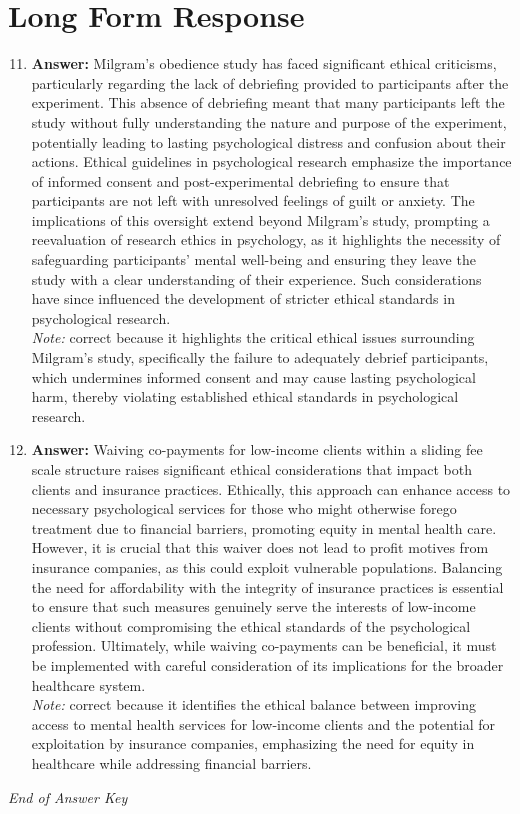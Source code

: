 \documentclass[12pt]{article}
\begin{document}
\section*{Long Form Response}
\begin{enumerate}[label=\arabic*.]
\setcounter{enumi}{10}
\item \textbf{Answer:} Milgram's obedience study has faced significant ethical criticisms, particularly regarding the lack of debriefing provided to participants after the experiment. This absence of debriefing meant that many participants left the study without fully understanding the nature and purpose of the experiment, potentially leading to lasting psychological distress and confusion about their actions. Ethical guidelines in psychological research emphasize the importance of informed consent and post-experimental debriefing to ensure that participants are not left with unresolved feelings of guilt or anxiety. The implications of this oversight extend beyond Milgram's study, prompting a reevaluation of research ethics in psychology, as it highlights the necessity of safeguarding participants' mental well-being and ensuring they leave the study with a clear understanding of their experience. Such considerations have since influenced the development of stricter ethical standards in psychological research.
\\ \textit{Note:} correct because it highlights the critical ethical issues surrounding Milgram's study, specifically the failure to adequately debrief participants, which undermines informed consent and may cause lasting psychological harm, thereby violating established ethical standards in psychological research.
\item \textbf{Answer:} Waiving co-payments for low-income clients within a sliding fee scale structure raises significant ethical considerations that impact both clients and insurance practices. Ethically, this approach can enhance access to necessary psychological services for those who might otherwise forego treatment due to financial barriers, promoting equity in mental health care. However, it is crucial that this waiver does not lead to profit motives from insurance companies, as this could exploit vulnerable populations. Balancing the need for affordability with the integrity of insurance practices is essential to ensure that such measures genuinely serve the interests of low-income clients without compromising the ethical standards of the psychological profession. Ultimately, while waiving co-payments can be beneficial, it must be implemented with careful consideration of its implications for the broader healthcare system.
\\ \textit{Note:} correct because it identifies the ethical balance between improving access to mental health services for low-income clients and the potential for exploitation by insurance companies, emphasizing the need for equity in healthcare while addressing financial barriers.
\end{enumerate}

\vfill
\noindent\textit{End of Answer Key}
\end{document}

